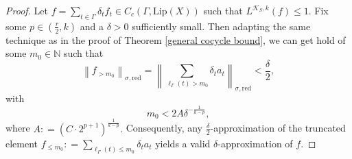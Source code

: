\documentclass[a4paper,11pt,reqno]{amsart}
\theoremstyle{plain}
\theoremstyle{mainthmstyle}
\theoremstyle{named}
\numberwithin{equation}{section}
\begin{document}
\begin{proof}
Let $f = \sum\limits_{t \in \Gamma} \delta_t f_t \in C_c(\Gamma, \mathrm {Lip} (X))$ such that $L^{\mathcal{K}_S, k}(f) \leq 1.$ Fix some $p \in \left (\frac {r} {2}, k \right )$ and a $\delta > 0$ sufficiently small. Then adapting the same technique as in the proof of Theorem \ref{general cocycle bound}, we can get hold of some $m_0 \in \mathbb N$ such that
$$\left \|f_{> m_0} \right \|_{\sigma, \mathrm {red}} = \left \|\sum\limits_{\ell_{\Gamma} (t) > m_0} \delta_t a_t \right \|_{\sigma, \mathrm {red}} < \frac {\delta} {2},$$ with
\begin{equation} \label{upper bound for m_0} m_0 < 2 A \delta^{- \frac {1} {k - p}}, \end{equation}
where $A : = \left (C \cdot 2^{p + 1} \right )^{\frac {1} {k - p}}.$ Consequently, any $\frac{\delta}{2}$-approximation of the truncated element $f_{\leq m_0} : = \sum\limits_{\ell_{\Gamma} (t) \leq m_0} \delta_t a_t$ yields a valid $\delta$-approximation of $f.$

\vspace{0.5mm}


\end{proof}
\end{document}
